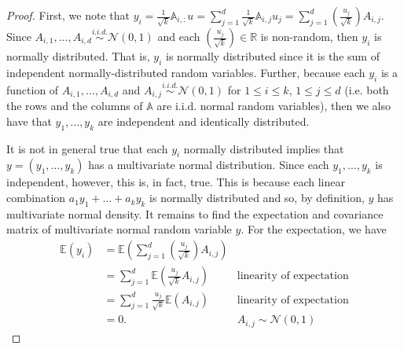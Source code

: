 \documentclass{article}
\begin{document}
    \begin{proof}
    First, we note that $y_i = \frac{1}{\sqrt{k}} \mathbb{A}_{i,:}u = \sum_{j=1}^d \frac{1}{\sqrt{k}} \mathbb{A}_{i,j} u_j = \sum_{j=1}^d \left(\frac{u_j}{\sqrt{k}} \right) A_{i,j}$. Since $A_{i,1}, \ldots, A_{i,d} \overset{i.i.d.}{\sim} \mathcal{N}(0, 1)$ and each $\left(\frac{u_j}{\sqrt{k}} \right) \in \mathbb{R}$ is non-random, then $y_i$ is normally distributed. That is, $y_i$ is normally distributed since it is the sum of independent normally-distributed random variables. Further, because each $y_i$ is a function of $A_{i,1}, \ldots, A_{i,d}$ and $A_{i, j} \overset{i.i.d.}{\sim} \mathcal{N}(0, 1)$ for $1 \le i \le k$, $1 \le j \le d$ (i.e. both the rows and the columns of $\mathbb{A}$ are i.i.d. normal random variables), then we also have that $y_1, \ldots, y_k$ are independent and identically distributed. 
    
    \noindent
    It is not in general true that each $y_i$ normally distributed implies that $y = (y_1, \ldots, y_k)$ has a multivariate normal distribution. Since each $y_1, \ldots, y_k$ is independent, however, this is, in fact, true. This is because each linear combination $a_1y_1 + \ldots + a_ky_k$ is normally distributed and so, by definition, $y$ has multivariate normal density. It remains to find the expectation and covariance matrix of multivariate normal random variable $y$. For the expectation, we have
    \begin{align*}
        \mathbb{E}(y_i) &= \mathbb{E} \left( \sum_{j=1}^d \left(\frac{u_j}{\sqrt{k}} \right) A_{i,j} \right)\\
                        &= \sum_{j=1}^d \mathbb{E}\left( \frac{u_j}{\sqrt{k}}A_{i,j}  \right) &\text{linearity of expectation}\\
                        &= \sum_{j=1}^d \frac{u_j}{\sqrt{k}} \mathbb{E}\left(A_{i,j} \right) &\text{linearity of expectation}\\
                        &= 0. &A_{i,j} \sim \mathcal{N}(0, 1)
    \end{align*}
    

\end{proof}
\end{document}
